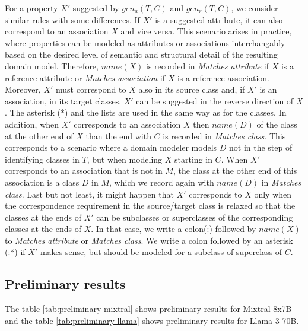 For a property $X'$ suggested by $gen_a(T,C)$ and $gen_r(T,C)$, we consider similar rules with some differences.
If $X'$ is a suggested attribute, it can also correspond to an association $X$ and vice versa.
This scenario arises in practice, where properties can be modeled as attributes or associations interchangably based on the desired level of semantic and structural detail of the resulting domain model.
Therefore, $name(X)$ is recorded in \emph{Matches attribute} if $X$ is a reference attribute or \emph{Matches association} if $X$ is a reference association.
Moreover, $X'$ must correspond to $X$ also in its source class and, if $X'$ is an association, in its target classes.
$X'$ can be suggested in the reverse direction of $X$.
The asterisk (*) and the lists are used in the same way as for the classes.
In addition, when $X'$ corresponds to an association $X$ then $name(D)$ of the class at the other end of $X$ than the end with $C$ is recorded in \emph{Matches class}.
This corresponds to a scenario where a domain modeler models $D$ not in the step of identifying classes in $T$, but when modeling $X$ starting in $C$.
When $X'$ corresponds to an association that is not in $M$, the class at the other end of this association is a class $D$ in $M$, which we record again with $name(D)$ in \emph{Matches class}.
Last but not least, it might happen that $X'$ corresponds to $X$ only when the correspondence requirement in the source/target class is relaxed so that the classes at the ends of $X'$ can be subclasses or superclasses of the corresponding classes at the ends of $X$.
In that case, we write a colon(:) followed by $name(X)$ to \emph{Matches attribute} or \emph{Matches class}.
We write a colon followed by an asterisk (:*) if $X'$ makes sense, but should be modeled for a subclass of superclass of $C$.


\subsection{Preliminary results}

The table \ref{tab:preliminary-mixtral} shows preliminary results for Mixtral-8x7B and the table \ref{tab:preliminary-llama} shows preliminary results for Llama-3-70B.

